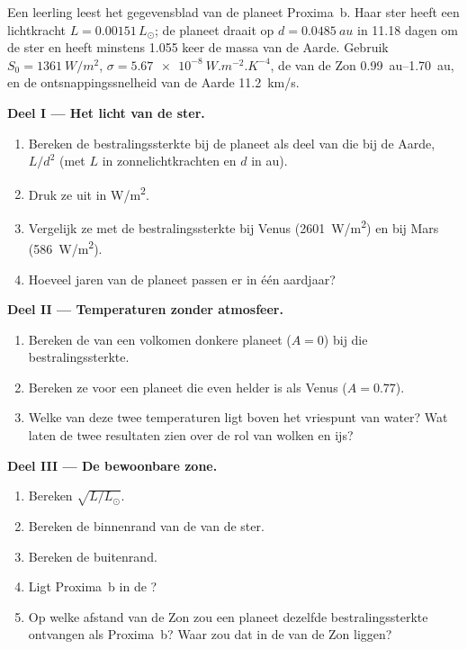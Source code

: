 \begin{problem}
\label{pb:g10:habitable-planet:1}
Een leerling leest het gegevensblad van de planeet Proxima~b. Haar ster heeft
een lichtkracht $L = 0.00151\,L_\odot$; de planeet draait op $d = \qty{0.0485}{au}$
in 11.18 dagen om de ster en heeft minstens 1.055 keer de massa van de Aarde.
Gebruik $S_0 = \qty{1361}{W/m^2}$, $\sigma = \qty{5.67e-8}{W.m^{-2}.K^{-4}}$, de
 van de Zon \qtyrange{0.99}{1.70}{au}, en de
ontsnappingssnelheid van de Aarde \qty{11.2}{km/s}.

\medskip
\noindent\textbf{Deel I --- Het licht van de ster.}
\begin{enumerate}
  \item Bereken de bestralingssterkte bij de planeet als deel van die bij de
        Aarde, $L/d^2$ (met $L$ in zonnelichtkrachten en $d$ in au).
  \item Druk ze uit in \unit{W/m^2}.
  \item Vergelijk ze met de bestralingssterkte bij Venus (\qty{2601}{W/m^2}) en
        bij Mars (\qty{586}{W/m^2}).
  \item Hoeveel jaren van de planeet passen er in één aardjaar?
\end{enumerate}

\medskip
\noindent\textbf{Deel II --- Temperaturen zonder atmosfeer.}
\begin{enumerate}[resume]
  \item Bereken de  van een volkomen donkere planeet
        ($A = 0$) bij die bestralingssterkte.
  \item Bereken ze voor een planeet die even helder is als Venus ($A = 0.77$).
  \item Welke van deze twee temperaturen ligt boven het vriespunt van water?
        Wat laten de twee resultaten zien over de rol van wolken en
        ijs?
\end{enumerate}

\medskip
\noindent\textbf{Deel III --- De bewoonbare zone.}
\begin{enumerate}[resume]
  \item Bereken $\sqrt{L/L_\odot}$.
  \item Bereken de binnenrand van de  van de ster.
  \item Bereken de buitenrand.
  \item Ligt Proxima~b in de ?
  \item Op welke afstand van de Zon zou een planeet dezelfde
        bestralingssterkte ontvangen als Proxima~b? Waar zou dat in de
         van de Zon liggen?
\end{enumerate}


\end{problem}
